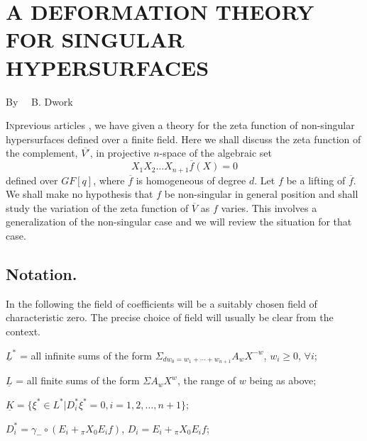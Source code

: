 \chapter[\textsc{B. Dwork~:} A Deformation Theory for Singular Hyper-surfaces]{A DEFORMATION THEORY FOR SINGULAR HYPERSURFACES}\label{art07}

\begin{center}
By~~ B. Dwork
\end{center}



\setcounter{pageoriginal}{84}
\textsc{In}\pageoriginale previous articles \cite{art07-key1}, \cite{art07-key2}
 we have given a theory for the zeta function of non-singular hypersurfaces defined over a finite field. Here we shall discuss the zeta function of the complement, $\overline{V'}$, in projective $n$-space of the algebraic set
$$
X_{1}X_{2}\ldots X_{n+1}\overline{f}(X)=0
$$
defined over $GF[q]$, where $\overline{f}$ is homogeneous of degree $d$. Let $f$ be a lifting of $\overline{f}$. We shall make no hypothesis that $f$ be non-singular in general position and shall study the variation of the zeta function of $\overline{V}$ as $f$ varies. This involves a generalization of the non-singular case and we will review the situation for that case.

\section{Notation.}\label{art07-sec1}

In the following the field of coefficients will be a suitably chosen field of characteristic zero. The precise choice of field will usually be clear from the context.

\smallskip

$\underline{L}^{*}$ = all infinite sums of the form $\Sigma_{dw_{0}=w_{1}+\cdots+w_{n+1}}A_{w}X^{-w}$, $w_{i}\geq 0$, $\forall i$;

\smallskip

$\underline{L}$ = all finite sums of the form $\Sigma A_{w}X^{w}$, the range of $w$ being as above;

\smallskip

$\underline{K}=\{\xi^{*}\in L^{*}|D^{*}_{i}\xi^{*}=0,i=1,2,\ldots,n+1\}$;

\smallskip

$D^{*}_{i}=\gamma_{-}\circ (E_{i}+{}_{\pi}X_{0}E_{i}f)$, $D_{i}=E_{i}+{}_{\pi}X_{0}E_{i}f$;


